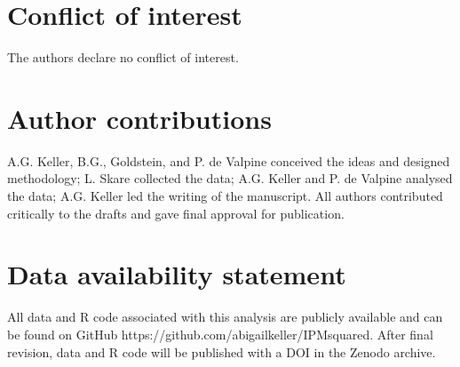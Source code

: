 \documentclass{article}
\begin{document}
\section{Conflict of interest}

The authors declare no conflict of interest.

\section{Author contributions}

A.G. Keller, B.G., Goldstein, and P. de Valpine conceived the ideas and designed methodology; L. Skare collected the data; A.G. Keller and P. de Valpine analysed the data; A.G. Keller led the writing of the manuscript. All authors contributed critically to the drafts and gave final approval for publication.

\section{Data availability statement}

All data and R code associated with this analysis are publicly available and can be found on GitHub https://github.com/abigailkeller/IPMsquared. After final revision, data and R code will be published with a DOI in the Zenodo archive.
\end{document}

